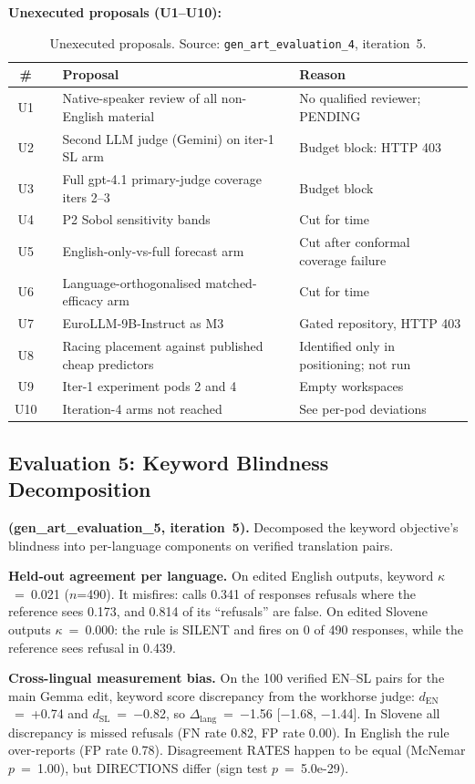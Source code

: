 \documentclass[11pt,letterpaper]{article}
\begin{document}
\textbf{Unexecuted proposals (U1--U10):}

\begin{longtable}{clp{5.5cm}p{5.5cm}}
\caption{Unexecuted proposals. Source: \texttt{gen\_art\_evaluation\_4}, iteration~5.} \label{tab:unexecuted} \\
\toprule
\# & & Proposal & Reason \\
\midrule
\endfirsthead
U1 && Native-speaker review of all non-English material & No qualified reviewer; PENDING \\
U2 && Second LLM judge (Gemini) on iter-1 SL arm & Budget block: HTTP 403 \\
U3 && Full gpt-4.1 primary-judge coverage iters 2--3 & Budget block \\
U4 && P2 Sobol sensitivity bands & Cut for time \\
U5 && English-only-vs-full forecast arm & Cut after conformal coverage failure \\
U6 && Language-orthogonalised matched-efficacy arm & Cut for time \\
U7 && EuroLLM-9B-Instruct as M3 & Gated repository, HTTP 403 \\
U8 && Racing placement against published cheap predictors & Identified only in positioning; not run \\
U9 && Iter-1 experiment pods 2 and 4 & Empty workspaces \\
U10 && Iteration-4 arms not reached & See per-pod deviations \\
\bottomrule
\end{longtable}


\subsection{Evaluation 5: Keyword Blindness Decomposition}\label{sec:eval5}

\textbf{(gen\_art\_evaluation\_5, iteration~5).} Decomposed the keyword objective's blindness into per-language components on verified translation pairs.

\textbf{Held-out agreement per language.} On edited English outputs, keyword $\kappa$~=~0.021 ($n$=490). It misfires: calls 0.341 of responses refusals where the reference sees 0.173, and 0.814 of its ``refusals'' are false. On edited Slovene outputs $\kappa$~=~0.000: the rule is SILENT and fires on 0 of 490 responses, while the reference sees refusal in 0.439.

\textbf{Cross-lingual measurement bias.} On the 100 verified EN--SL pairs for the main Gemma edit, keyword score discrepancy from the workhorse judge: $d_\mathrm{EN}$~=~+0.74 and $d_\mathrm{SL}$~=~$-$0.82, so $\Delta_\mathrm{lang}$~=~$-$1.56 [$-$1.68, $-$1.44]. In Slovene all discrepancy is missed refusals (FN rate 0.82, FP rate 0.00). In English the rule over-reports (FP rate 0.78). Disagreement RATES happen to be equal (McNemar $p$~=~1.00), but DIRECTIONS differ (sign test $p$~=~5.0e-29).
\end{document}
